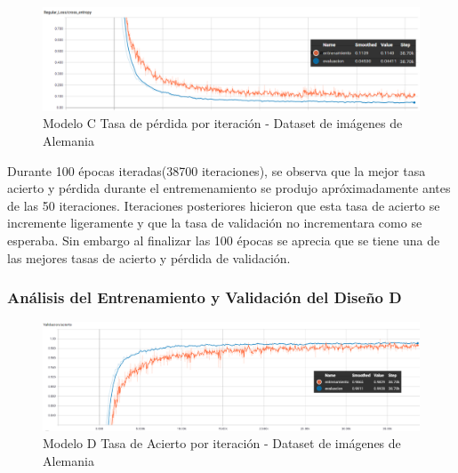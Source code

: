 			
			\begin{figure}[H]
				\begin{center}
				\includegraphics[width=1\textwidth]{images/desarrollo/trainResults/german/model4Loss} 
				\end{center}
				\begin{center}
				\caption{\small{Modelo C Tasa de pérdida por iteración - Dataset de imágenes de Alemania}}
				
				{\small{\fontsize{10}{16.8}\selectfont {Fuente: Elaboración propia}}}
				\end{center}
				\vspace{-1.5em}
			\end{figure}

			Durante 100 épocas iteradas(38700 iteraciones), se observa que la mejor tasa acierto y pérdida durante el entremenamiento se produjo apróximadamente antes de las 50 iteraciones. Iteraciones posteriores hicieron que esta tasa de acierto se incremente ligeramente y que la tasa de validación no incrementara como se esperaba. Sin embargo al finalizar las 100 épocas se aprecia que se tiene una de las mejores tasas de acierto y pérdida de validación.

		\subsubsection{Análisis del Entrenamiento y Validación del Diseño D} 
			\begin{figure}[H]
				\begin{center}
				\includegraphics[width=1\textwidth]{images/desarrollo/trainResults/german/model6Acierto} 
				\end{center}
				\begin{center}
				\caption{\small{Modelo D Tasa de Acierto por iteración - Dataset de imágenes de Alemania  }}
				
				{\small{\fontsize{10}{16.8}\selectfont {Fuente: Elaboración propia}}}
				\end{center}
				\vspace{-1.5em}
			\end{figure}
			
